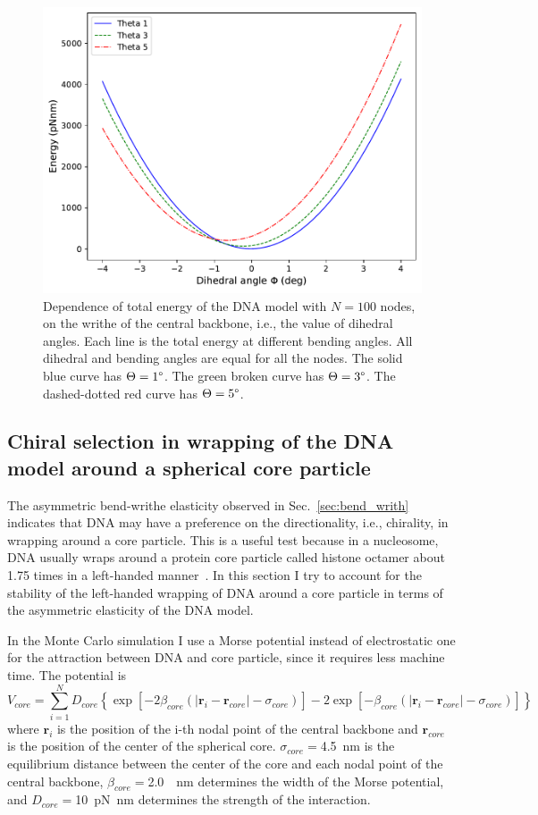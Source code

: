 \documentclass[a4paper,10pt]{article}
\begin{document}
\begin{figure}[htbp]
\centering
\includegraphics[width=.5\textwidth]{bw_energy.pdf}
\caption{Dependence of total energy of the DNA model with $N=100$ nodes, on the writhe of the central backbone, i.e., the value of dihedral angles.
Each line is the total energy at different bending angles.
All dihedral and bending angles are equal for all the nodes.
The solid blue curve has $\Theta=1\degree$.
The green broken curve has $\Theta=3\degree$.
The dashed-dotted red curve has $\Theta=5\degree$.}
\label{fig:bend_energy}
\end{figure}

\subsection{Chiral selection in wrapping of the DNA model around a spherical core particle}\label{sec:core}
The asymmetric bend-writhe elasticity observed in Sec.~\ref{sec:bend_writh} indicates that DNA may have a preference on the directionality, i.e., chirality, in wrapping around a core particle.
This is a useful test because in a nucleosome, DNA usually wraps around a protein core particle called histone octamer about 1.75 times in a left-handed manner~\cite{1, 2}.
In this section I try to account for the stability of the left-handed wrapping of DNA around a core particle in terms of the asymmetric elasticity of the DNA model.

In the Monte Carlo simulation I use a Morse potential instead of electrostatic one for the attraction between DNA and core particle, since it requires less machine time.
The potential is
\begin{equation}\label{eq:core}
V_{core}=\sum_{i=1}^{N}D_{core}\left\{\exp\left[-2\beta_{core}\left(\left|\textbf{r}_{i}-\textbf{r}_{core}\right|-\sigma_{core}\right)\right]-2\exp\left[-\beta_{core}\left(\left|\textbf{r}_{i}-\textbf{r}_{core}\right|-\sigma_{core}\right)\right]\right\}
\end{equation}
where $\textbf{r}_i$ is the position of the i-th nodal point of the central backbone and $\textbf{r}_{core}$ is the position of the center of the spherical core.
$\sigma_{core}=$\SI{4.5}{\nm} is the equilibrium distance between the center of the core and each nodal point of the central backbone, $\beta_{core}=$\SI{2.0}{\per\nm} determines the width of the Morse potential, and $D_{core}=$\SI{10}{\pico\newton\nano\meter} determines the strength of the interaction.
\end{document}
